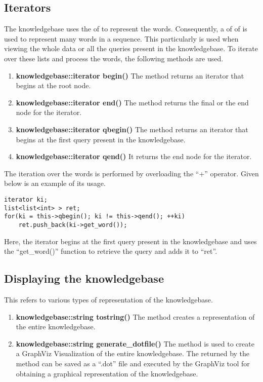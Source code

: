 \subsection*{Iterators}

The knowledgebase uses the \lists of \integer to represent the words. Consequently, a \lists of \lists of \integer is used to represent many words in a sequence. This particularly is used when viewing the whole data or all the queries present in the knowledgebase. To iterate over these lists and process the words, the following methods are used. 

\begin{enumerate}
\item \textbf{knowledgebase::iterator begin()} \vskip 1pt
	The method returns an iterator that begins at the root node.

\item \textbf{knowledgebase::iterator end()} \vskip 1pt
	The method returns the final or the end node for the iterator.
	 
\item \textbf{knowledgebase::iterator qbegin()} \vskip 1pt
	The method returns an iterator that begins at the first query present in the knowledgebase.
	
\item \textbf{knowledgebase::iterator qend()} \vskip 1pt
	It returns the end node for the iterator.
\end{enumerate}

The iteration over the words is performed by overloading the ``+'' operator. Given below is an example of its usage.
\begin{lstlisting}
iterator ki;
list<list<int> > ret;
for(ki = this->qbegin(); ki != this->qend(); ++ki)
	ret.push_back(ki->get_word());
\end{lstlisting}
Here, the iterator begins at the first query present in the knowledgebase and uses the ``get\_word()'' function to retrieve the query and adds it to ``ret''.

\subsection*{Displaying the knowledgebase}
This refers to various types of representation of the knowledgebase.

\begin{enumerate}

\item \textbf{knowledgebase::string tostring()} \vskip 1pt
The method creates a \stringtype representation of the entire knowledgebase.

\item \textbf{knowledgebase::string generate\_dotfile()} \vskip 1pt
The method is used to create a GraphViz Visualization of the entire knowledgebase. The \stringtype returned by the method can be saved as a ``.dot'' file and executed by the GraphViz tool for obtaining a graphical representation of the knowledgebase. 

\end {enumerate}

